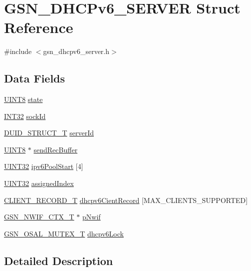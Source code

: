 \hypertarget{a00047}{
\section{GSN\_\-DHCPv6\_\-SERVER Struct Reference}
\label{a00047}
}


{\ttfamily \#include $<$gsn\_\-dhcpv6\_\-server.h$>$}

\subsection*{Data Fields}
\begin{DoxyCompactItemize}
\item 
\hyperlink{a00660_gab27e9918b538ce9d8ca692479b375b6a}{UINT8} \hyperlink{a00047_a6e9c4cbd32a1178b12f3a61f6855c896}{state}
\item 
\hyperlink{a00660_ga63021d67d54286c2163bcdb43a6f2569}{INT32} \hyperlink{a00047_ab14e42f085ec55398e27c831f8f031d2}{sockId}
\item 
\hyperlink{a00017}{DUID\_\-STRUCT\_\-T} \hyperlink{a00047_a21dfcbd048f42b506500600ce9be2897}{serverId}
\item 
\hyperlink{a00660_gab27e9918b538ce9d8ca692479b375b6a}{UINT8} $\ast$ \hyperlink{a00047_a2c58739c6106df2d2968e4abd908650f}{sendRecBuffer}
\item 
\hyperlink{a00660_gae1e6edbbc26d6fbc71a90190d0266018}{UINT32} \hyperlink{a00047_a9678a3db2e57b60f576c69bfc2fa949b}{ipv6PoolStart} \mbox{[}4\mbox{]}
\item 
\hyperlink{a00660_gae1e6edbbc26d6fbc71a90190d0266018}{UINT32} \hyperlink{a00047_a60dd11d89e78ea4add98607f68802a31}{assignedIndex}
\item 
\hyperlink{a00011}{CLIENT\_\-RECORD\_\-T} \hyperlink{a00047_a7eb7bb83582baba9ff1dce2ac2a6bb12}{dhcpv6CientRecord} \mbox{[}MAX\_\-CLIENTS\_\-SUPPORTED\mbox{]}
\item 
\hyperlink{a00167}{GSN\_\-NWIF\_\-CTX\_\-T} $\ast$ \hyperlink{a00047_a98d510676ecd134a5e9ac61bf222cded}{pNwif}
\item 
\hyperlink{a00628_gae997291afc7166c897f459023e0154ad}{GSN\_\-OSAL\_\-MUTEX\_\-T} \hyperlink{a00047_a127f3fd8c83b1bda70dce36aba52681f}{dhcpv6Lock}
\end{DoxyCompactItemize}


\subsection{Detailed Description}


